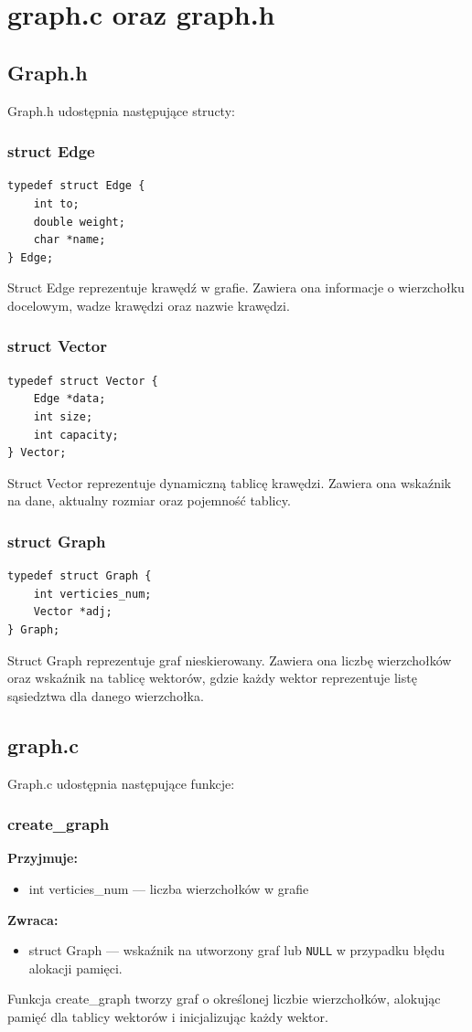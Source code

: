\documentclass[12pt]{article}
\begin{document}
\section{graph.c oraz graph.h}
\subsection{Graph.h}
Graph.h udostępnia następujące structy:
\subsubsection{struct Edge}
\begin{lstlisting}
typedef struct Edge {
    int to;
    double weight;
    char *name;
} Edge;
\end{lstlisting}
Struct Edge reprezentuje krawędź w grafie. Zawiera ona informacje o wierzchołku
docelowym, wadze krawędzi oraz nazwie krawędzi.
\subsubsection{struct Vector}
\begin{lstlisting}
typedef struct Vector {
    Edge *data;
    int size;
    int capacity;
} Vector;
\end{lstlisting}
Struct Vector reprezentuje dynamiczną tablicę krawędzi. Zawiera ona wskaźnik na
dane, aktualny rozmiar oraz pojemność tablicy.
\subsubsection{struct Graph}
\begin{lstlisting}
typedef struct Graph {
    int verticies_num;
    Vector *adj;
} Graph;
\end{lstlisting}
Struct Graph reprezentuje graf nieskierowany. Zawiera ona liczbę wierzchołków
oraz wskaźnik na tablicę wektorów, gdzie każdy wektor reprezentuje listę
sąsiedztwa dla danego wierzchołka.
\subsection{graph.c}
Graph.c udostępnia następujące funkcje:
\subsubsection{create\_graph}
\textbf{Przyjmuje:}
\begin{itemize}
	\item int verticies\_num --- liczba wierzchołków w grafie
\end{itemize}
\textbf{Zwraca:}
\begin{itemize}
	\item struct Graph --- wskaźnik na utworzony graf lub \texttt{NULL} w przypadku błędu alokacji pamięci.
\end{itemize}
Funkcja create\_graph tworzy graf o określonej liczbie wierzchołków, alokując
pamięć dla tablicy wektorów i inicjalizując każdy wektor.
\end{document}
